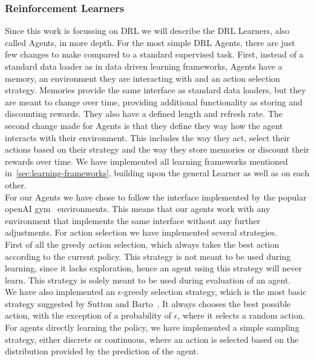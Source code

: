 \documentclass[11pt,a4paper]{article}
\begin{document}
	\subsubsection{Reinforcement Learners}
	Since this work is focussing on DRL we will describe the DRL Learners, also called Agents, in more depth.
	For the most simple DRL Agents, there are just few changes to make compared to a standard supervised task.
	First, instead of a standard data loader as in data driven learning frameworks, Agents have a memory, an environment they are interacting with and an action selection strategy.
	Memories provide the same interface as standard data loaders, but they are meant to change over time, providing additional functionality as storing and discounting rewards.
	They also have a defined length and refresh rate.
	The second change made for Agents is that they define they way how the agent interacts with their environment.
	This includes the way they act, select their actions based on their strategy and the way they store memories or discount their rewards over time.
	We have implemented all learning frameworks mentioned in~\ref{sec:learning-frameworks}, building upon the general Learner as well as on each other.\\
	
	
	For our Agents we have chose to follow the interface implemented by the popular openAI gym~\cite{openai_gym_nodate} environments.
	This means that our agents work with any environment that implements the same interface without any further adjustments.
	For action selection we have implemented several strategies.\\

	First of all the greedy action selection, which always takes the best action according to the current policy.
	This strategy is not meant to be used during learning, since it lacks exploration, hence an agent using this strategy will never learn.
	This strategy is solely meant to be used during evaluation of an agent.\\

	We have also implemented an $\epsilon$-greedy selection strategy, which is the most basic strategy suggested by Sutton and Barto~\cite{sutton_introduction_1998}.
	It always chooses the best possible action, with the exception of a probability of $\epsilon$, where it selects a random action.\\

	For agents directly learning the policy, we have implemented a simple sampling strategy, either discrete or continuous, where an action is selected based on the distribution provided by the prediction of the agent.\\
\end{document}
